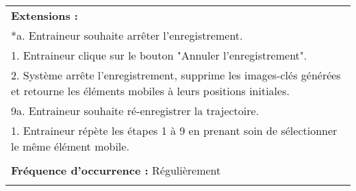 \begin{longtable}{|p{16cm}|}
	\textbf{Extensions :}\\
	*a. Entraineur souhaite arrêter l'enregistrement.\\
	\hspace{0.5cm}1. Entraineur clique sur le bouton "Annuler l'enregistrement".\\
	\hspace{0.5cm}2. Système arrête l'enregistrement, supprime les images-clés générées et retourne les éléments mobiles à leurs positions initiales.\\
	9a. Entraineur souhaite ré-enregistrer la trajectoire.\\
	\hspace{0.5cm}1. Entraineur répète les étapes 1 à 9 en prenant soin de sélectionner le même élément mobile.\\
	\\
	\textbf{Fréquence d'occurrence :} Régulièrement\\
	\\
	\hline
\end{longtable}


